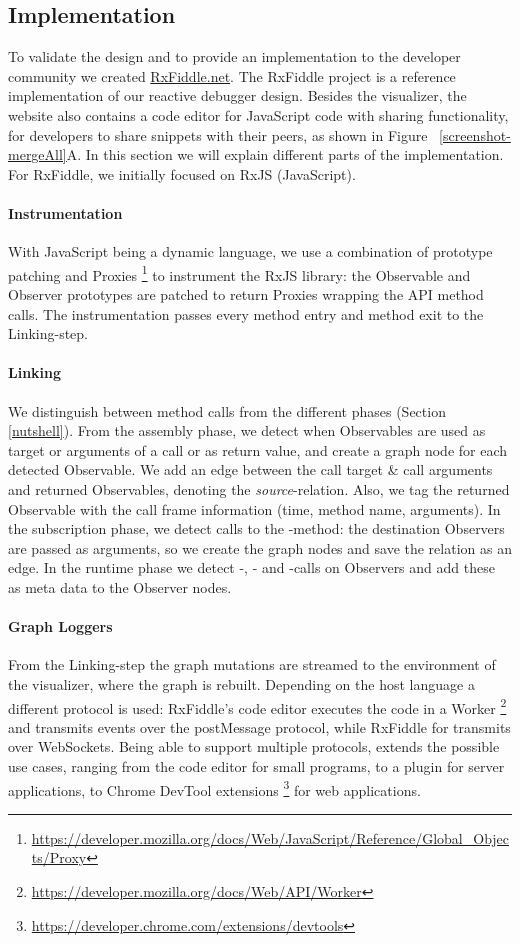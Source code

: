 \subsection{Implementation} To validate the design and to provide an
implementation to the developer community we created \url{RxFiddle.net}.
The RxFiddle project is a reference implementation of our reactive
debugger design.  Besides the visualizer, the website also contains a
code editor for JavaScript code with sharing functionality, for
developers to share snippets with their peers, as shown in Figure~%
\ref{screenshot-mergeAll}A.  In this section we will explain different
parts of the implementation.  For RxFiddle, we initially focused on RxJS
(JavaScript).

\paragraph{Instrumentation} With JavaScript being a dynamic language, we
use a combination of prototype patching and Proxies%
\footnote{\url{https://developer.mozilla.org/docs/Web/JavaScript/Reference/Global_Objects/Proxy}}
to instrument the RxJS library:  the Observable and Observer prototypes
are patched to return Proxies wrapping the API method calls.  The
instrumentation passes every method entry and method exit to the
Linking-step.

\paragraph{Linking} We distinguish between method calls from the
different phases (Section~%
\ref{nutshell}).  From the assembly phase, we detect when Observables
are used as target or arguments of a call or as return value, and create
a graph node for each detected Observable.  We add an edge between the
call target \& call arguments and returned Observables, denoting the
\emph{source}-relation.  Also, we tag the returned Observable with the
call frame information (time, method name, arguments).  In the
subscription phase, we detect calls to the -method:  the
destination Observers are passed as arguments, so we create the graph
nodes and save the relation as an edge.  In the runtime phase we detect
-, - and -calls on Observers and add
these as meta data to the Observer nodes.

\paragraph{Graph Loggers} From the Linking-step the graph mutations are
streamed to the environment of the visualizer, where the graph is
rebuilt.  Depending on the host language a different protocol is used:
RxFiddle's code editor executes the code in a Worker%
\footnote{\url{https://developer.mozilla.org/docs/Web/API/Worker}} and
transmits events over the postMessage protocol, while RxFiddle for
\NodeJS{} transmits over WebSockets.  Being able to support multiple
protocols, extends the possible use cases, ranging from the code editor
for small programs, to a \NodeJS{} plugin for server applications, to
Chrome DevTool extensions%
\footnote{\url{https://developer.chrome.com/extensions/devtools}} for
web applications.

